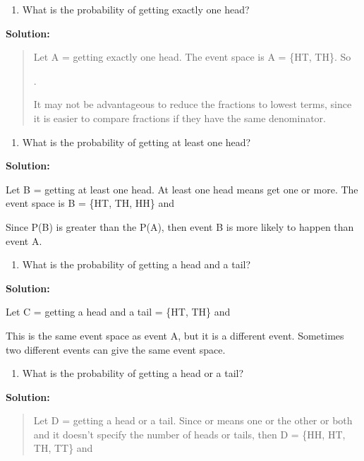 \documentclass[]{book}
\providecommand{\tightlist}{%
  \setlength{\itemsep}{0pt}\setlength{\parskip}{0pt}}
\begin{document}
\begin{enumerate}
\def\labelenumi{\alph{enumi}.}
\setcounter{enumi}{1}
\tightlist
\item
  What is the probability of getting exactly one head?
\end{enumerate}

\textbf{Solution:}

\begin{quote}
Let A = getting exactly one head. The event space is A = \{HT, TH\}. So

.

It may not be advantageous to reduce the fractions to lowest terms,
since it is easier to compare fractions if they have the same
denominator.
\end{quote}

\begin{enumerate}
\def\labelenumi{\alph{enumi}.}
\setcounter{enumi}{2}
\tightlist
\item
  What is the probability of getting at least one head?
\end{enumerate}

\textbf{Solution:}

Let B = getting at least one head. At least one head means get one
or more. The event space is B = \{HT, TH, HH\} and

Since P(B) is greater than the P(A), then event B is more likely to
happen than event A.

\begin{enumerate}
\def\labelenumi{\alph{enumi}.}
\setcounter{enumi}{3}
\tightlist
\item
  What is the probability of getting a head and a tail?
\end{enumerate}

\textbf{Solution:}

Let C = getting a head and a tail = \{HT, TH\} and

This is the same event space as event A, but it is a different
event. Sometimes two different events can give the same event space.

\begin{enumerate}
\def\labelenumi{\alph{enumi}.}
\setcounter{enumi}{4}
\tightlist
\item
  What is the probability of getting a head or a tail?
\end{enumerate}

\textbf{Solution:}

\begin{quote}
Let D = getting a head or a tail. Since or means one or the other or
both and it doesn't specify the number of heads or tails, then D =
\{HH, HT, TH, TT\} and
\end{quote}
\end{document}
